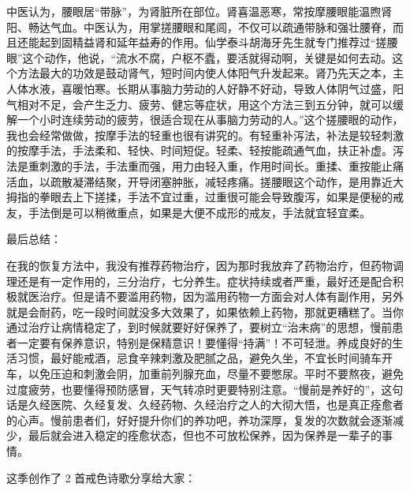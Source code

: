 \documentclass{ctexart}
\begin{document}
\begin{description}
    中医认为，腰眼居“带脉”，为肾脏所在部位。肾喜温恶寒，常按摩腰眼能温煦肾阳、畅达气血。中医认为，用掌搓腰眼和尾闾，不仅可以疏通带脉和强壮腰脊，而且还能起到固精益肾和延年益寿的作用。仙学泰斗胡海牙先生就专门推荐过“搓腰眼”这个动作，他说，“流水不腐，户枢不蠹，要活就得动啊，关键是如何去动。这个方法最大的功效是鼓动肾气，短时间内使人体阳气升发起来。肾乃先天之本，主人体水液，喜暖怕寒。长期从事脑力劳动的人好静不好动，导致人体阴气过盛，阳气相对不足，会产生乏力、疲劳、健忘等症状，用这个方法三到五分钟，就可以缓解一个小时连续劳动的疲劳，很适合现在从事脑力劳动的人。”这个搓腰眼的动作，我也会经常做做，按摩手法的轻重也很有讲究的。有轻重补泻法，补法是较轻刺激的按摩手法，手法柔和、轻快、时间短促。轻柔、轻按能疏通气血，扶正补虚。泻法是重刺激的手法，手法重而强，用力由轻入重，作用时间长。重揉、重按能止痛活血，以疏散凝滞结聚，开导闭塞肿胀，减轻疼痛。搓腰眼这个动作，是用靠近大拇指的拳眼去上下搓揉，手法不宜过重，过重很可能会导致腹泻，如果是便秘的戒友，手法倒是可以稍微重点，如果是大便不成形的戒友，手法就宜轻宜柔。
\end{description}

最后总结：

在我的恢复方法中，我没有推荐药物治疗，因为那时我放弃了药物治疗，但药物调理还是有一定作用的，三分治疗，七分养生。症状持续或者严重，最好还是配合积极就医治疗。但是请不要滥用药物，因为滥用药物一方面会对人体有副作用，另外就是会耐药，吃一段时间就没多大效果了，如果依赖上药物，那就更糟糕了。当你通过治疗让病情稳定了，到时候就要好好保养了，要树立“治未病”的思想，慢前患者一定要有保养意识，特别是保精意识！要懂得“持满”！不可轻泄。养成良好的生活习惯，最好能戒酒，忌食辛辣刺激及肥腻之品，避免久坐，不宜长时间骑车开车，以免压迫和刺激会阴，加重前列腺充血，尽量不要憋尿。平时不要熬夜，避免过度疲劳，也要懂得预防感冒，天气转凉时更要特别注意。“慢前是养好的”，这句话是久经医院、久经复发、久经药物、久经治疗之人的大彻大悟，也是真正痊愈者的心声。慢前患者们，好好提升你们的养功吧，养功深厚，复发的次数就会逐渐减少，最后就会进入稳定的痊愈状态，但也不可放松保养，因为保养是一辈子的事情。


这季创作了 2 首戒色诗歌分享给大家：
\end{document}
